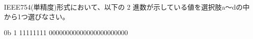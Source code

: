 IEEE754(単精度)形式において、以下の 2 進数が示している値を選択肢a〜dの中から1つ選びなさい。

\bigskip
\begin{center}
0b 1 11111111 00000000000000000000000
\end{center}
